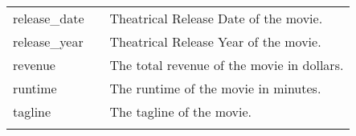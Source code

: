\documentclass[11pt]{article}
\begin{document}
\begin{longtable}[]{@{}lll@{}}
\begin{minipage}[t]{0.28\columnwidth}
release\_date\strut
\end{minipage} & \begin{minipage}[t]{0.05\columnwidth}\raggedright\strut
\strut
\end{minipage} & \begin{minipage}[t]{0.28\columnwidth}\raggedright\strut
Theatrical Release Date of the movie.\strut
\end{minipage}\tabularnewline
\begin{minipage}[t]{0.28\columnwidth}\raggedright\strut
release\_year\strut
\end{minipage} & \begin{minipage}[t]{0.05\columnwidth}\raggedright\strut
\strut
\end{minipage} & \begin{minipage}[t]{0.28\columnwidth}\raggedright\strut
Theatrical Release Year of the movie.\strut
\end{minipage}\tabularnewline
\begin{minipage}[t]{0.28\columnwidth}\raggedright\strut
revenue\strut
\end{minipage} & \begin{minipage}[t]{0.05\columnwidth}\raggedright\strut
\strut
\end{minipage} & \begin{minipage}[t]{0.28\columnwidth}\raggedright\strut
The total revenue of the movie in dollars.\strut
\end{minipage}\tabularnewline
\begin{minipage}[t]{0.28\columnwidth}\raggedright\strut
runtime\strut
\end{minipage} & \begin{minipage}[t]{0.05\columnwidth}\raggedright\strut
\strut
\end{minipage} & \begin{minipage}[t]{0.28\columnwidth}\raggedright\strut
The runtime of the movie in minutes.\strut
\end{minipage}\tabularnewline
\begin{minipage}[t]{0.28\columnwidth}\raggedright\strut
tagline\strut
\end{minipage} & \begin{minipage}[t]{0.05\columnwidth}\raggedright\strut
\strut
\end{minipage} & \begin{minipage}[t]{0.28\columnwidth}\raggedright\strut
The tagline of the movie.\strut
\end{minipage}\tabularnewline
\begin{minipage}[t]{0.28\columnwidth}\raggedright\strut

\end{minipage}
\end{longtable}
\end{document}
